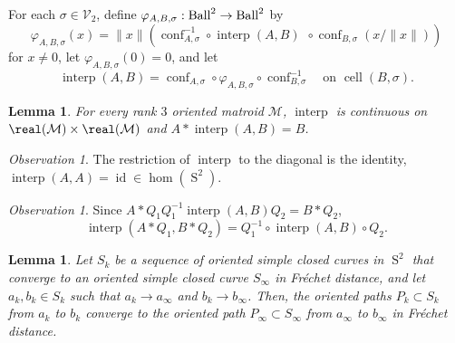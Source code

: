 \documentclass[JEP,XML,SOM,Unicode,NoFloatCountersInSection,published]{cedram}
\newtheorem{lemma}[theorem]{Lemma}
\theoremstyle{remark}
\newtheorem{observation}[theorem]{Observation}
\let\mc\mathcal
\let\phi\varphi
\DeclareMathOperator{\sphere}{S}
\DeclareMathOperator{\cell}{cell}
\DeclareMathOperator{\conf}{conf}
\newcommand{\Ball}{\text{\rm Ball}}
\DeclareMathOperator{\interp}{interp}
\DeclareMathOperator{\id}{id}
\begin{document}
For each $\sigma \in \mc{V}_{2}$, define
$ \phi_{A,B,\sigma} : \Ball^2 \to \Ball^2 $ by\vspace*{-3pt}
\[ \phi_{A,B,\sigma}(x) = \|x\| \left(\conf_{A,\sigma}^{-1} \circ \interp(A,B)^{\phantom1} \circ \conf_{B,\sigma}^{\phantom1}(x/\|x\|) \right) \]
for $x \neq 0$, let $\phi_{A,B,\sigma}(0)=0$,
and let\vspace*{-3pt}
\[ \interp(A,B) = \conf_{A,\sigma}^{\phantom1} \circ \phi_{A,B,\sigma}^{\phantom1} \circ \conf_{B,\sigma}^{-1} \quad
\text{on } \cell(B,\sigma).\]

\begin{lemma}\label{lemma-interp}
For every rank $3$ oriented matroid $\mc{M}$, $\interp$ is continuous on \hbox{$\real(\mc{M}) \times \real(\mc{M})$} and $A* \interp(A,B) = B$.
\end{lemma}

\begin{observation}\label{observation-interp-id}
The restriction of $\interp$ to the diagonal is the identity, \ie $\interp(A,A) = \id \in \hom(\sphere^2)$.
\end{observation}

\begin{observation}\label{observation-orthinterp}
Since $A*Q_1Q_1^{-1} \interp(A,B) Q_2 = B*Q_2 $,\vspace*{-3pt}
\[ \interp(A*Q_1,B*Q_2) = Q_1^{-1} \circ \interp(A,B) \circ Q_2. \]
\end{observation}

\begin{lemma}\label{lemma-path}
Let $S_k$ be a sequence of oriented simple closed curves in $\sphere^2$ that converge to an oriented simple closed curve $S_\infty$ in Fréchet distance, and let $a_k,b_k \in S_k$ such that $a_k \to a_\infty$ and $b_k \to b_\infty$. Then, the oriented paths $P_k \subset S_k$ from $a_k$ to $b_k$ converge to the oriented path $P_\infty \subset S_\infty$ from $a_\infty$ to $b_\infty$ in Fréchet distance.
\end{lemma}
\end{document}
